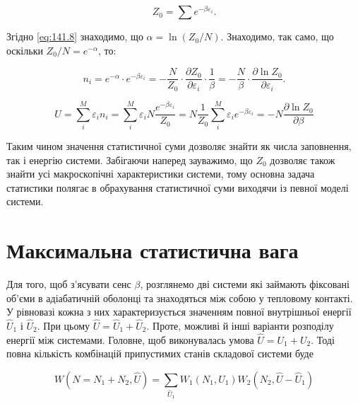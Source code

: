 \begin{equation}
	Z_0=\sum e^{-\beta\varepsilon_i}.
	\label{eq:141.9}
\end{equation}

Згідно \eqref{eq:141.8} знаходимо, що $\alpha = \ln (Z_0 / N)$. Знаходимо, так само, що оскільки $Z_0 / N = e^{-\alpha}$, то:

\begin{equation}
	n_i=e^{-\alpha}\cdot e^{-\beta\varepsilon_i}=-\frac{N}{Z_0}\cdot\frac{\partial Z_0}{\partial\varepsilon_i}\cdot\frac{1}{\beta}=-\frac{N}{\beta}\cdot\frac{\partial\ln{Z_0}}{\partial\varepsilon_i}.
	\label{eq:141.10}
\end{equation}

\begin{equation}
	U = \sum_i^M \varepsilon_i n_i = \sum_i^M \varepsilon_i N \frac{e^{-\beta \varepsilon_i}}{Z_0} = N \frac{1}{Z_0} \sum_i^M \varepsilon_i e^{-\beta \varepsilon_i} = -N \frac{\partial \ln Z_0}{\partial \beta}
	\label{eq:141.11}
\end{equation}

Таким чином значення статистичної суми дозволяє знайти як числа заповнення, так і енергію системи. Забігаючи наперед зауважимо, що $Z_0$ дозволяє також знайти усі макроскопічні характеристики системи, тому основна задача статистики полягає в обрахування статистичної суми виходячи із певної моделі системи.

\section{Максимальна статистична вага}\label{sec:MaxStatWeight}

Для того, щоб з’ясувати сенс $\beta$, розглянемо дві системи які займають фіксовані об’єми в адіабатичній оболонці та знаходяться між собою у тепловому контакті. У рівновазі кожна з них характеризується значенням повної внутрішньої енергії $\hat{U}_1$ і $\hat{U}_2$. При цьому $\hat{U} = \hat{U}_1 + \hat{U}_2$. Проте, можливі й інші варіанти розподілу енергії між системами. Головне, щоб виконувалась умова $\hat{U} = U_1 + U_2$. Тоді повна кількість комбінацій припустимих станів складової системи буде

\begin{equation}
	W(N=N_1 + N_2, \hat{U})= \sum_{\hat{U}_1} W_1(N_1, U_1) W_2(N_2, \hat{U} - \hat{U}_1)
	\label{eq:142.1}
\end{equation}


